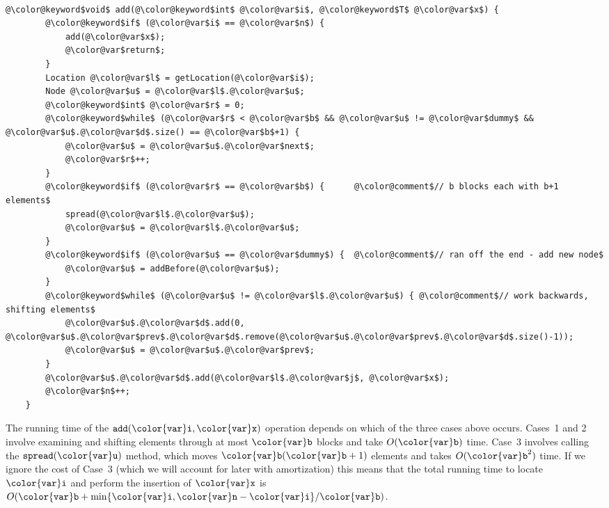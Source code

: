 \documentclass[10pt]{book}
\theoremstyle{plain}
\theoremstyle{definition}
\begin{document}
 \ \vspace{.5ex}\begin{Verbatim}[gobble=1,tabsize=2,frame=single,framerule=1.2pt,commandchars=\\@\$,label=\texttt{SEList},labelposition=topline]
	@\color@keyword$void$ add(@\color@keyword$int$ @\color@var$i$, @\color@keyword$T$ @\color@var$x$) {
		@\color@keyword$if$ (@\color@var$i$ == @\color@var$n$) {
			add(@\color@var$x$);
			@\color@var$return$;
		}
		Location @\color@var$l$ = getLocation(@\color@var$i$);
		Node @\color@var$u$ = @\color@var$l$.@\color@var$u$;
		@\color@keyword$int$ @\color@var$r$ = 0;
		@\color@keyword$while$ (@\color@var$r$ < @\color@var$b$ && @\color@var$u$ != @\color@var$dummy$ && @\color@var$u$.@\color@var$d$.size() == @\color@var$b$+1) {
			@\color@var$u$ = @\color@var$u$.@\color@var$next$;
			@\color@var$r$++;
		}
		@\color@keyword$if$ (@\color@var$r$ == @\color@var$b$) {      @\color@comment$// b blocks each with b+1 elements$
			spread(@\color@var$l$.@\color@var$u$);
			@\color@var$u$ = @\color@var$l$.@\color@var$u$;
		} 
		@\color@keyword$if$ (@\color@var$u$ == @\color@var$dummy$) {  @\color@comment$// ran off the end - add new node$
			@\color@var$u$ = addBefore(@\color@var$u$);
		}
		@\color@keyword$while$ (@\color@var$u$ != @\color@var$l$.@\color@var$u$) { @\color@comment$// work backwards, shifting elements$
			@\color@var$u$.@\color@var$d$.add(0, @\color@var$u$.@\color@var$prev$.@\color@var$d$.remove(@\color@var$u$.@\color@var$prev$.@\color@var$d$.size()-1));
			@\color@var$u$ = @\color@var$u$.@\color@var$prev$;
		}
		@\color@var$u$.@\color@var$d$.add(@\color@var$l$.@\color@var$j$, @\color@var$x$);
		@\color@var$n$++;
	}
\end{Verbatim}


The running time of the \ensuremath{\mathtt{add({\color{var}i},{\color{var}x})}} operation depends on which of
the three cases above occurs.  Cases~1 and 2 involve examining and
shifting elements through at most \ensuremath{\mathtt{{\color{var}b}}} blocks and take $O(\ensuremath{\mathtt{{\color{var}b}}})$ time.
Case~3 involves calling the \ensuremath{\mathtt{spread({\color{var}u})}} method, which  moves $\ensuremath{\mathtt{{\color{var}b}}}(\ensuremath{\mathtt{{\color{var}b}}}+1)$
elements and takes $O(\ensuremath{\mathtt{{\color{var}b}}}^2)$ time.  If we ignore the cost of Case~3
(which we will account for later with amortization) this means that
the total running time to locate \ensuremath{\mathtt{{\color{var}i}}} and perform the insertion of \ensuremath{\mathtt{{\color{var}x}}}
is $O(\ensuremath{\mathtt{{\color{var}b}}}+\min\{\ensuremath{\mathtt{{\color{var}i}}},\ensuremath{\mathtt{{\color{var}n}}}-\ensuremath{\mathtt{{\color{var}i}}}\}/\ensuremath{\mathtt{{\color{var}b}}})$.
\end{document}

